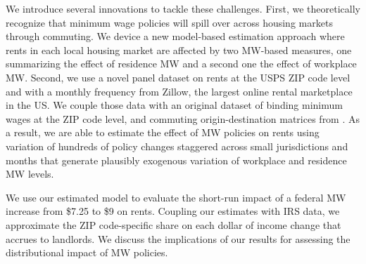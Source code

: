 We introduce several innovations to tackle these challenges.
First, we theoretically recognize that minimum wage policies will spill over across
housing markets through commuting.
We device a new model-based estimation approach where rents in each local housing 
market are affected by two MW-based measures, one summarizing the effect of 
residence MW and a second one the effect of workplace MW.
Second, we use a novel panel dataset on rents at the USPS ZIP code level and with 
a monthly frequency from Zillow, the largest online rental marketplace in the US.
We couple those data with an original dataset of binding minimum wages at the
ZIP code level, and commuting origin-destination matrices from \textcite{LODES}.
As a result, we are able to estimate the effect of MW policies on rents using 
variation of hundreds of policy changes staggered across small jurisdictions and 
months that generate plausibly exogenous variation of workplace and residence MW
levels.

We use our estimated model to evaluate the short-run impact of a federal MW 
increase from \$7.25 to \$9 on rents.
Coupling our estimates with IRS data, we approximate the ZIP code-specific share 
on each dollar of income change that accrues to landlords.
We discuss the implications of our results for assessing the distributional 
impact of MW policies.


